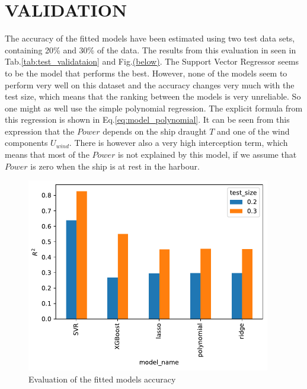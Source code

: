 \section*{VALIDATION}\label{validation}
The accuracy of the fitted models have been estimated using two test
data sets, containing 20\% and 30\% of the data. The results from this
evaluation in seen in Tab.\ref{tab:test_validataion} and
Fig.\href{fig_test_evaluation}{(below)}. The Support Vector Regressor
seems to be the model that performs the best. However, none of the
models seem to perform very well on this dataset and the accuracy
changes very much with the test size, which means that the ranking
between the models is very unreliable. So one might as well use the
simple polynomial regression. The explicit formula from this regression
is shown in Eq.\ref{eq:model_polynomial}. It can be seen from
this expression that the $Power$ depends on the ship draught $T$ and
one of the wind components $U_{wind}$. There is however also a very
high interception term, which means that most of the $Power$ is not
explained by this model, if we assume that $Power$ is zero when the
ship is at rest in the harbour.
\begin{figure}[H]
\begin{center}\includegraphics[width = 0.95\textwidth]{figures/test_evaluation.pdf}\end{center}
\vspace{-0.7cm}
\caption{Evaluation of the fitted models accuracy}
\label{fig:test_evaluation}
\end{figure}
